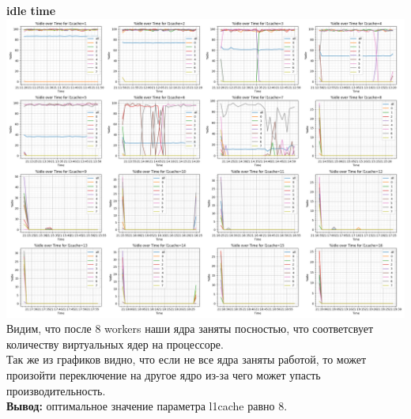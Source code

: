 \textbf{idle time}\\
\includegraphics[width=\textwidth]{./cache/image/l1cache-each-idle-cpu.png}
Видим, что после 8 workers наши ядра заняты посностью, что соответсвует количеству виртуальных ядер на процессоре.\\
Так же из графиков видно, что если не все ядра заняты работой, то может произойти переключение на другое ядро из-за чего может упасть производительность.\\
\textbf{Вывод:} оптимальное значение параметра l1cache равно 8.

